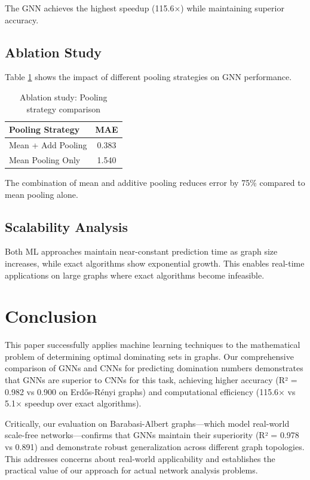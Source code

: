 \documentclass{article}
\begin{document}
The GNN achieves the highest speedup (115.6×) while maintaining superior accuracy.

\subsection{Ablation Study}

Table \ref{tab:ablation} shows the impact of different pooling strategies on GNN performance.

\begin{table}[h]
  \caption{Ablation study: Pooling strategy comparison}
  \label{tab:ablation}
  \centering
  \begin{tabular}{lc}
    \toprule
    Pooling Strategy & MAE \\
    \midrule
    Mean + Add Pooling & 0.383 \\
    Mean Pooling Only & 1.540 \\
    \bottomrule
  \end{tabular}
\end{table}

The combination of mean and additive pooling reduces error by 75\% compared to mean pooling alone.

\subsection{Scalability Analysis}

Both ML approaches maintain near-constant prediction time as graph size increases, while exact algorithms show exponential growth. This enables real-time applications on large graphs where exact algorithms become infeasible.

\section{Conclusion}

This paper successfully applies machine learning techniques to the mathematical problem of determining optimal dominating sets in graphs. Our comprehensive comparison of GNNs and CNNs for predicting domination numbers demonstrates that GNNs are superior to CNNs for this task, achieving higher accuracy (R² = 0.982 vs 0.900 on Erdős-Rényi graphs) and computational efficiency (115.6× vs 5.1× speedup over exact algorithms).

Critically, our evaluation on Barabasi-Albert graphs—which model real-world scale-free networks—confirms that GNNs maintain their superiority (R² = 0.978 vs 0.891) and demonstrate robust generalization across different graph topologies. This addresses concerns about real-world applicability and establishes the practical value of our approach for actual network analysis problems.
\end{document}

